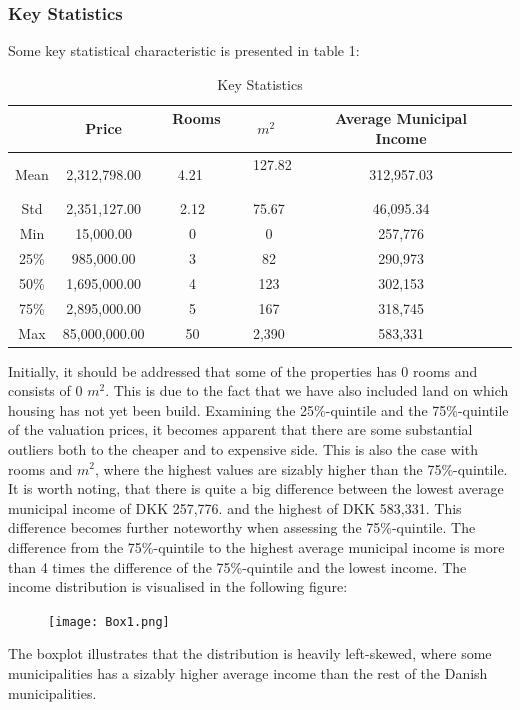 \documentclass[12pt,a4paper]{article}
\begin{document}
\subsubsection{Key Statistics}
Some key statistical characteristic is presented in table 1:
\begin{table}[H]
\begin{center}
\caption{Key Statistics\label{time}}
\begin{tabular}{| c | c | c | c | c | c |} 
\hline
   & Price & \, Rooms \ & \ $m^2$ \ & Average Municipal Income \\ \hline
   Mean & 2,312,798.00 & \ 4.21 \  & \ 127.82 \ & 312,957.03 \\ \hline
   Std & 2,351,127.00 & 2.12 & 75.67 & 46,095.34 \\ \hline
   Min & 15,000.00 & 0 & 0 & 257,776 \\ \hline
   25\% & 985,000.00 & 3 & 82 & 290,973 \\ \hline
   50\% & 1,695,000.00 & 4 & 123 & 302,153 \\ \hline
   75\% & 2,895,000.00 & 5 & 167 & 318,745 \\ \hline
   Max & 85,000,000.00 & 50 & 2,390 & 583,331 \\ \hline
\end{tabular}
\end{center}
\end{table} 
Initially, it should be addressed that some of the properties has 0 rooms and consists of 0 $m^2$.  This is due to the fact that we have also included land on which housing has not yet been build. Examining the 25\%-quintile and the 75\%-quintile of the valuation prices, it becomes apparent that there are some substantial outliers both to the cheaper and to expensive side. This is also the case with rooms and $m^2$, where the highest values are sizably higher than the 75\%-quintile. 
It is worth noting, that there is quite a big difference between the lowest average municipal income of DKK 257,776. and the highest of DKK 583,331. This difference becomes further noteworthy when assessing the 75\%-quintile. The difference from the 75\%-quintile to the highest average municipal income is more than 4 times the difference of the 75\%-quintile and the lowest income. The income distribution is visualised in the following figure:
\begin{figure}[H]
  \centering
   \caption{}
   \texttt{[image: Box1.png]} 
  \label{fig:}
\end{figure}
The boxplot illustrates that the distribution is heavily left-skewed, where some municipalities has a sizably higher average income than the rest of the Danish municipalities. 
\end{document}
